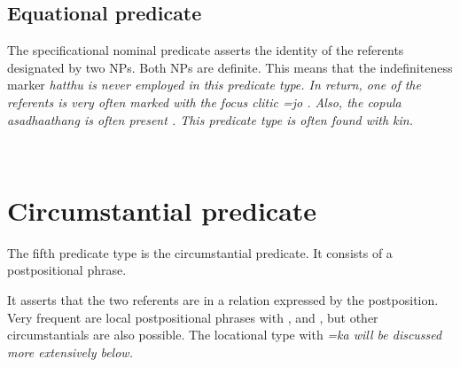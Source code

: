 \subsection{Equational predicate}\label{sec:pred:Equationalpredicate}
The specificational nominal predicate   asserts the identity of the referents designated by two NPs. Both NPs are  definite. This means that the indefiniteness marker \em hatthu \em is never employed in this predicate type. In return, one of the referents is very often marked with the focus clitic \em =jo \em {}. Also, the copula \em asadhaathang \em is often present . This predicate type is often found with kin.

 


 \\
\section{Circumstantial predicate}\label{sec:pred:Circumstantialpredicate}
The fifth predicate type is the circumstantial predicate. It consists of a postpositional phrase.


It asserts that the two referents are in a relation expressed by the postposition. Very frequent are local postpositional phrases with ,  and , but other circumstantials are also possible. The locational type with \em =ka \em will be discussed more extensively below.
\\


